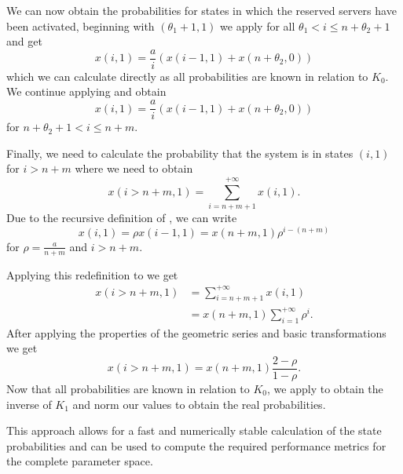 We can now obtain the probabilities for states in which the reserved servers have been activated, beginning with \((\theta_1 + 1,1)\) we apply  for all \(\theta_1 < i \leq n + \theta_2 + 1\) and get
\begin{equation*}
x(i,1) = \frac{a}{i}(x(i-1,1)+ x(n+\theta_2,0))
\end{equation*}
which we can calculate directly as all probabilities are known in relation to \(K_0\).
We continue applying  and obtain
\begin{equation}
x(i,1) = \frac{a}{i}(x(i-1,1) + x(n+\theta_2,0))\label{eq:cloud:data_centers:modeling:energy_efficient:probability_greater_nm}
\end{equation}
for \(n + \theta_2 + 1 < i \leq n + m\).

Finally, we need to calculate the probability that the system is in states \((i,1)\) for \(i > n + m\) where we need to obtain
\begin{equation*}
x(i>n+m,1) = \sum_{i = n + m + 1}^{+ \infty} x(i,1).
\end{equation*}
Due to the recursive definition of , we can write
\begin{equation*}
x(i,1) = \rho x(i-1,1) = x(n + m,1)\rho^{i-(n+m)}
\end{equation*}
for \(\rho = \frac{a}{n + m}\) and \(i > n + m\).

Applying this redefinition to  we get
\begin{align*}
x(i>n+m,1) &= \sum_{i = n + m + 1}^{+ \infty} x(i, 1)\\
&= x(n+m,1)\sum_{i=1}^{+\infty} \rho^i.\nonumber
\end{align*}
After applying the properties of the geometric series and basic transformations we get
\begin{equation*}
x(i>n+m,1) =x(n + m,1) \frac{2-\rho}{1-\rho}.
\end{equation*}
Now that all probabilities are known in relation to \(K_0\), we apply  to obtain the inverse of \(K_1\) and norm our values to obtain the real probabilities.

This approach allows for a fast and numerically stable calculation of the state probabilities and can be used to compute the required performance metrics for the complete parameter space.
